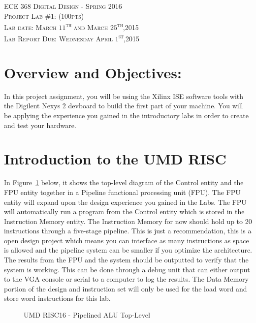 \documentclass{article}
\begin{document}
\begin{center}
\textsc{\huge ECE 368 Digital Design - Spring 2016}\\[1cm]
\textsc{{\LARGE Project Lab \#1: (100pts)}}\\[0.5cm]
\textsc{\Large Lab date: March $11$\textsuperscript{th} and March $25$\textsuperscript{th},2015}\\[0.5cm]
\textsc{\Large Lab Report Due: Wednesday April $1$\textsuperscript{st},2015}\\[1cm]
\end{center}

\section{Overview and Objectives:}
In this project assignment, you will be using the Xilinx ISE software tools with the Digilent Nexys 2 devboard to build the first part of your machine. You will be applying the experience you gained in the introductory labs in order to create and test your hardware.

\section{Introduction to the UMD RISC}
In Figure~\ref{fig:pipetoplevel} below, it shows the top-level diagram of the Control entity and the FPU entity together in a Pipeline functional processing unit (FPU). The FPU entity will expand upon the design experience you gained in the Labs. The FPU will automatically run a program from the Control entity which is stored in the Instruction Memory entity. The Instruction Memory for now should hold up to 20 instructions through a five-stage pipeline. This is just a recommendation, this is a open design project which means you can interface as many instructions as space is allowed and the pipeline system can be smaller if you optimize the architecture. The results from the FPU and the system should be outputted to verify that the system is working. This can be done through a debug unit that can either output to the VGA console or serial to a computer to log the results. The Data Memory portion of the design and instruction set will only be used for the load word and store word instructions for this lab.

\begin{figure}[!htbp]
  \centering
  \caption{UMD RISC16 - Pipelined ALU Top-Level}
  \label{fig:pipetoplevel}
\end{figure}
\FloatBarrier
\end{document}
